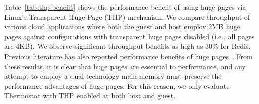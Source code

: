 Table~\ref{tab:thp-benefit} shows the performance benefit of using huge pages
via Linux's Transparent Huge Page (THP) mechanism. We compare throughput of
various cloud applications where both the guest and host employ 2MB huge pages
against configurations with transparent huge pages disabled (i.e., all pages are
4KB). We observe significant throughput benefits as high as 30\% for Redis.
Previous literature has also reported performance benefits of huge
pages~\cite{ref:Guo:2015:PBL:2731186.2731187, Basu2013, hugepages}. From these
results, it is clear that huge pages are essential to performance, and any
attempt to employ a dual-technology main memory must preserve the performance
advantages of huge pages. For this reason, we only evaluate Thermostat with THP
enabled at both host and guest.


%
